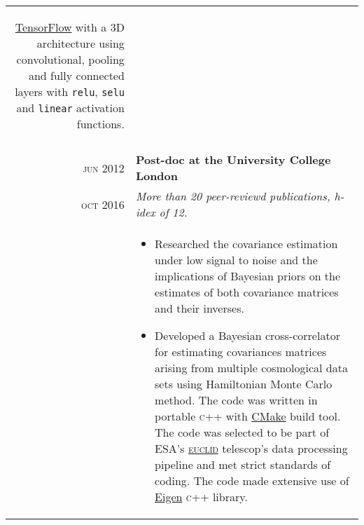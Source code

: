 \documentclass[a4paper,10pt]{article}
\begin{document}
\begin{tabular}{r|p{11cm}}
{\begin{itemize}
  \href{https://www.tensorflow.org/}{TensorFlow} with a 3D architecture using convolutional,
  pooling and fully connected layers with \texttt{relu}, \texttt{selu} and \texttt{linear} activation functions.

\end{itemize}
}\\
\multicolumn{2}{c}{} \\
\textsc{jun 2012} & \textbf{Post-doc at the University College London} \\
\textsc{oct 2016}	&\emph{More than 20 peer-reviewd publications, h-idex of 12.}\\
&\small{
\begin{itemize}
  \item Researched the covariance estimation under low signal to noise and the implications of Bayesian priors on the
  estimates of both covariance matrices and their inverses.
  \item Developed a Bayesian cross-correlator for estimating covariances matrices arising from multiple cosmological
  data sets using Hamiltonian Monte Carlo method. The code was written in portable \textsc{c++} with
  \href{https://cmake.org/}{CMake} build tool.
  The code was selected to be part of ESA's \href{https://www.euclid-ec.org/}{\textsc{euclid}} telescop's data processing   pipeline and met strict standards
  of coding. The code made extensive use of \href{http://eigen.tuxfamily.org/index.php?title=Main_Page}{Eigen} \textsc{c++} library.
\end{itemize}
}
\end{tabular}
\end{document}

